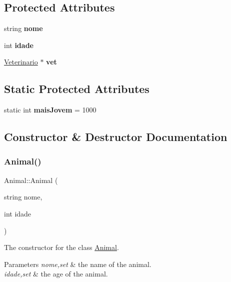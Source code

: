 \subsection*{Protected Attributes}
\begin{DoxyCompactItemize}
\item 
\mbox{\label{class_animal_a54f3f22208c7342039266c8c87de99e7}} 
string {\bfseries nome}
\item 
\mbox{\label{class_animal_ace29239b979d2ed3d48f8929707599b7}} 
int {\bfseries idade}
\item 
\mbox{\label{class_animal_ac09b1733db752e81740c78d67f4c06fc}} 
\mbox{\hyperlink{class_veterinario}{Veterinario}} $\ast$ {\bfseries vet}
\end{DoxyCompactItemize}
\subsection*{Static Protected Attributes}
\begin{DoxyCompactItemize}
\item 
\mbox{\label{class_animal_a846972be7eec62b3ece6edc7efaf45e1}} 
static int {\bfseries mais\+Jovem} = 1000
\end{DoxyCompactItemize}


\subsection{Constructor \& Destructor Documentation}
\mbox{\label{class_animal_a494c55efcd03365c4effd6a0b6a6df26}} 
\subsubsection{\texorpdfstring{Animal()}{Animal()}}
{\footnotesize\ttfamily Animal\+::\+Animal (\begin{DoxyParamCaption}\item[{string}]{nome,  }\item[{int}]{idade }\end{DoxyParamCaption})}

The constructor for the class \mbox{\hyperlink{class_animal}{Animal}}. 
\begin{DoxyParams}{Parameters}
{\em nome,set} & the name of the animal. \\
\hline
{\em idade,set} & the age of the animal. \\
\hline
\end{DoxyParams}
\mbox{\label{class_animal_a16d8b7f94611cc65f5cdb58cc105527b}} 
